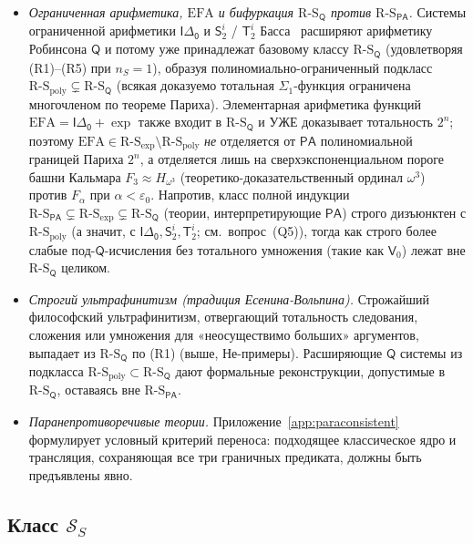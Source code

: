 \documentclass[11pt]{article}
\theoremstyle{plain}
\theoremstyle{definition}
\newcommand{\RS}{\mathrm{R\text{-}S}}
\newcommand{\cS}{\mathcal{S}}
\newcommand{\PA}{\mathsf{PA}}
\begin{document}
\begin{itemize}
\item \emph{Ограниченная арифметика, $\mathrm{EFA}$ и бифуркация $\RS_{\mathsf{Q}}$ против $\RS_{\PA}$.} Системы ограниченной арифметики $\mathsf{I\Delta_0}$ и $\mathsf{S}_2^i$ / $\mathsf{T}_2^i$ Басса~\cite{Buss1986} расширяют арифметику Робинсона $\mathsf{Q}$ и потому уже принадлежат базовому классу $\RS_{\mathsf{Q}}$ (удовлетворяя (R1)--(R5) при $n_S = 1$), образуя полиномиально-ограниченный подкласс $\RS_{\mathrm{poly}} \subsetneq \RS_{\mathsf{Q}}$ (всякая доказуемо тотальная $\Sigma_1$-функция ограничена многочленом по теореме Париха). Элементарная арифметика функций $\mathrm{EFA} = \mathsf{I\Delta_0} + \exp$ также входит в $\RS_{\mathsf{Q}}$ и УЖЕ доказывает тотальность $2^n$; поэтому $\mathrm{EFA} \in \RS_{\exp} \setminus \RS_{\mathrm{poly}}$ \emph{не} отделяется от $\PA$ полиномиальной границей Париха $2^n$, а отделяется лишь на сверхэкспоненциальном пороге башни Кальмара $F_3 \approx H_{\omega^3}$ (теоретико-доказательственный ординал $\omega^3$) против $F_\alpha$ при $\alpha < \varepsilon_0$. Напротив, класс полной индукции $\RS_{\PA} \subsetneq \RS_{\exp} \subsetneq \RS_{\mathsf{Q}}$ (теории, интерпретирующие $\PA$) строго дизъюнктен с $\RS_{\mathrm{poly}}$ (а значит, с $\mathsf{I\Delta_0}, \mathsf{S}_2^i, \mathsf{T}_2^i$; см.\ вопрос~(Q5)), тогда как строго более слабые под-$\mathsf{Q}$-исчисления без тотального умножения (такие как $\mathsf{V}_0$) лежат вне $\RS_{\mathsf{Q}}$ целиком.
\item \emph{Строгий ультрафинитизм (традиция Есенина-Вольпина).} Строжайший философский ультрафинитизм, отвергающий тотальность следования, сложения или умножения для «неосуществимо больших» аргументов, выпадает из $\RS_{\mathsf{Q}}$ по (R1) (выше, Не-примеры). Расширяющие $\mathsf{Q}$ системы из подкласса $\RS_{\mathrm{poly}} \subset \RS_{\mathsf{Q}}$ дают формальные реконструкции, допустимые в $\RS_{\mathsf{Q}}$, оставаясь вне $\RS_{\PA}$.
\item \emph{Паранепротиворечивые теории.} Приложение~\ref{app:paraconsistent} формулирует условный критерий переноса: подходящее классическое ядро и трансляция, сохраняющая все три граничных предиката, должны быть предъявлены явно.
\end{itemize}

\subsection{\texorpdfstring{Класс $\cS_S$}{Класс S\_S}}
\end{document}

